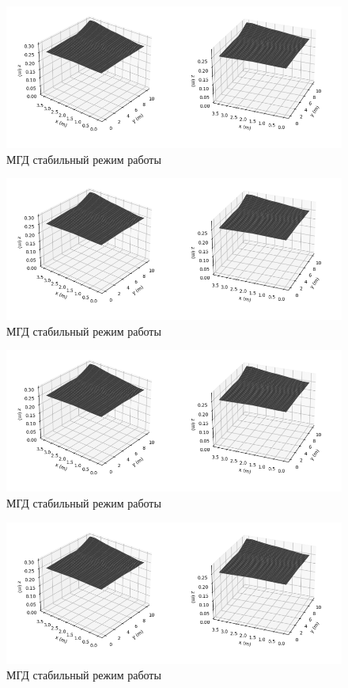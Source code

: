 \documentclass{article}
\begin{document}
\begin{figure}[H]
\hspace*{-5cm}\includegraphics[scale=0.01]{спокойная поверхность.PNG}
\caption{МГД стабильный режим работы}
\end{figure}
\begin{figure}[H]
\hspace*{-5cm}\includegraphics[scale=0.01]{спокойная поверхность.PNG}
\caption{МГД стабильный режим работы}
\end{figure}
\begin{figure}[H]
\hspace*{-5cm}\includegraphics[scale=0.01]{спокойная поверхность.PNG}
\caption{МГД стабильный режим работы}
\end{figure}
\begin{figure}[H]
\hspace*{-5cm}\includegraphics[scale=0.01]{спокойная поверхность.PNG}
\caption{МГД стабильный режим работы}
\end{figure}
\end{document}
